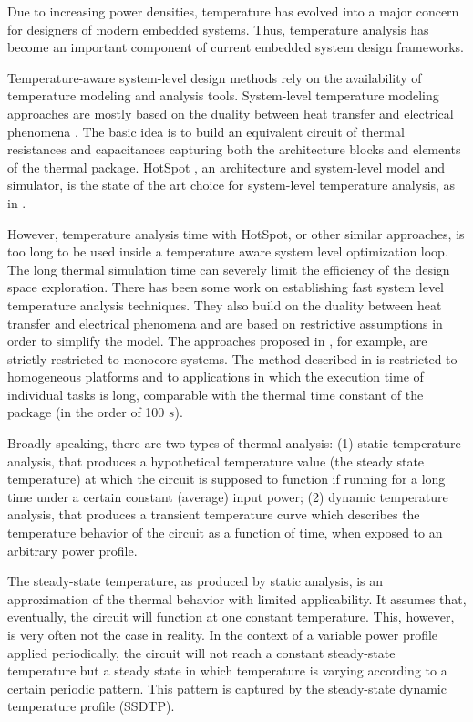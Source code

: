 Due to increasing power densities, temperature has evolved into a major concern for designers of modern embedded systems. Thus, temperature analysis has become an important component of current embedded system design frameworks.

Temperature-aware system-level design methods rely on the availability of temperature modeling and analysis tools. System-level temperature modeling approaches are mostly based on the duality between heat transfer and electrical phenomena \cite{kreith2000}. The basic idea is to build an equivalent circuit of thermal resistances and capacitances capturing both the architecture blocks and elements of the thermal package. HotSpot \cite{huang2003}, an architecture and system-level model and simulator, is the state of the art choice for system-level temperature analysis, as in \cite{srinivasan2004, liao2005, coskun2006, liu2007, huang2009, xiang2010, thiele2011}.

However, temperature analysis time with HotSpot, or other similar approaches, is too long to be used inside a temperature aware system level optimization loop. The long thermal simulation time can severely limit the efficiency of the design space exploration. There has been some work on establishing fast system level temperature analysis techniques. They also build on the duality between heat transfer and electrical phenomena and are based on restrictive assumptions in order to simplify the model. The approaches proposed in \cite{rai2011, bao2010}, for example, are strictly restricted to monocore systems. The method described in \cite{rao2009} is restricted to homogeneous platforms and to applications in which the execution time of individual tasks is long, comparable with the thermal time constant of the package (in the order of 100 $s$).

Broadly speaking, there are two types of thermal analysis: (1) static temperature analysis, that produces a hypothetical temperature value (the steady state temperature) at which the circuit is supposed to function if running for a long time under a certain constant (average) input power; (2) dynamic temperature analysis, that produces a transient temperature curve which describes the temperature behavior of the circuit as a function of time, when exposed to an arbitrary power profile.

The steady-state temperature, as produced by static analysis, is an approximation of the thermal behavior with limited applicability. It assumes that, eventually, the circuit will function at one constant temperature.  This, however, is very often not the case in reality. In the context of a variable power profile applied periodically, the circuit will not reach a constant steady-state temperature but a steady state in which temperature is varying according to a certain periodic pattern. This pattern is captured by the steady-state dynamic temperature profile (SSDTP).


